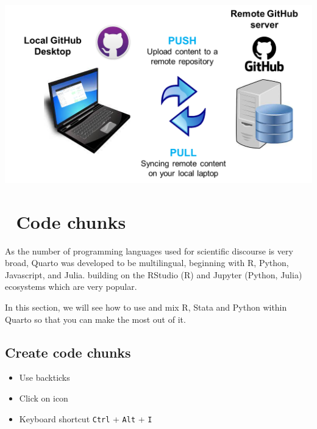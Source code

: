 \documentclass[
  letterpaper,
  DIV=11,
  numbers=noendperiod]{scrreprt}
\providecommand{\tightlist}{%
  \setlength{\itemsep}{0pt}\setlength{\parskip}{0pt}}\usepackage{longtable,booktabs,array}
\begin{document}
\includegraphics{./images/paste-A340C143.png}

\hypertarget{code-chunks-1}{%
\chapter{\texorpdfstring{{📘} Code
chunks}{📘 Code chunks}}\label{code-chunks-1}}

As the number of programming languages used for scientific discourse is
very broad, Quarto was developed to be multilingual, beginning with R,
Python, Javascript, and Julia. building on the RStudio (R) and Jupyter
(Python, Julia) ecosystems which are very popular.

In this section, we will see how to use and mix R, Stata and Python
within Quarto so that you can make the most out of it.

\hypertarget{create-code-chunks}{%
\section{Create code chunks}\label{create-code-chunks}}

\begin{tcolorbox}[enhanced jigsaw, colframe=quarto-callout-tip-color-frame, colback=white, rightrule=.15mm, bottomrule=.15mm, left=2mm, arc=.35mm, coltitle=black, title=\textcolor{quarto-callout-tip-color}{\faLightbulb}\hspace{0.5em}{Tip}, opacitybacktitle=0.6, bottomtitle=1mm, opacityback=0, toptitle=1mm, toprule=.15mm, colbacktitle=quarto-callout-tip-color!10!white, titlerule=0mm, leftrule=.75mm, breakable]

\begin{itemize}
\tightlist
\item
  Use backticks
\item
  Click on icon
\item
  Keyboard shortcut \texttt{Ctrl} + \texttt{Alt} + \texttt{I}
\end{itemize}

\end{tcolorbox}
\end{document}
